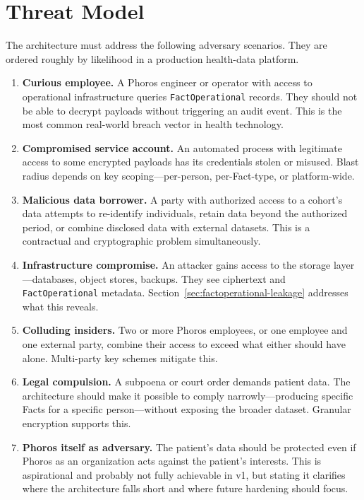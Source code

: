 \documentclass[11pt]{article}
\begin{document}
\section{Threat Model}
\label{sec:threat-model}

The architecture must address the following adversary scenarios. They are
ordered roughly by likelihood in a production health-data platform.

\begin{enumerate}

\item \textbf{Curious employee.} A Phoros engineer or operator with
  access to operational infrastructure queries \texttt{FactOperational}
  records. They should not be able to decrypt payloads without triggering
  an audit event. This is the most common real-world breach vector in
  health technology.

\item \textbf{Compromised service account.} An automated process with
  legitimate access to some encrypted payloads has its credentials
  stolen or misused. Blast radius depends on key scoping---per-person,
  per-Fact-type, or platform-wide.

\item \textbf{Malicious data borrower.} A party with authorized access
  to a cohort's data attempts to re-identify individuals, retain data
  beyond the authorized period, or combine disclosed data with external
  datasets. This is a contractual and cryptographic problem
  simultaneously.

\item \textbf{Infrastructure compromise.} An attacker gains access to
  the storage layer---databases, object stores, backups. They see
  ciphertext and \texttt{FactOperational} metadata.
  Section~\ref{sec:factoperational-leakage} addresses what this reveals.

\item \textbf{Colluding insiders.} Two or more Phoros employees, or one
  employee and one external party, combine their access to exceed what
  either should have alone. Multi-party key schemes mitigate this.

\item \textbf{Legal compulsion.} A subpoena or court order demands
  patient data. The architecture should make it possible to comply
  narrowly---producing specific Facts for a specific person---without
  exposing the broader dataset. Granular encryption supports this.

\item \textbf{Phoros itself as adversary.} The patient's data should be
  protected even if Phoros as an organization acts against the patient's
  interests. This is aspirational and probably not fully achievable in
  v1, but stating it clarifies where the architecture falls short and
  where future hardening should focus.

\end{enumerate}
\end{document}
